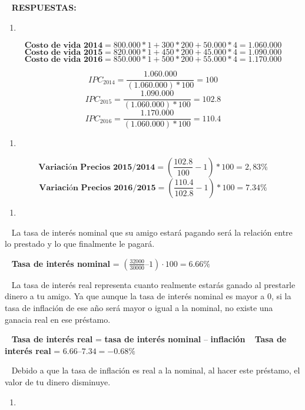 \documentclass[
  letterpaper,
  DIV=11,
  numbers=noendperiod]{scrreport}
\providecommand{\tightlist}{%
  \setlength{\itemsep}{0pt}\setlength{\parskip}{0pt}}\usepackage{longtable,booktabs,array}
\begin{document}
~ \textbf{RESPUESTAS:}

\begin{enumerate}
\def\labelenumi{\alph{enumi})}
\tightlist
\item
\end{enumerate}

\[\textbf{Costo de vida 2014} = 800.000*1+300*200+50.000*4 = 1.060.000\]
\[\textbf{Costo de vida 2015} = 820.000*1+450*200+45.000*4 = 1.090.000\]
\[\textbf{Costo de vida 2016} = 850.000*1+500*200+55.000*4 = 1.170.000\]

\[IPC_{2014} = \frac{1.060.000}{(1.060.000)*100} = 100\]
\[IPC_{2015} = \frac{1.090.000}{(1.060.000)*100} = 102.8\]
\[IPC_{2016} = \frac{1.170.000}{(1.060.000)*100} = 110.4\]

\begin{enumerate}
\def\labelenumi{\alph{enumi})}
\setcounter{enumi}{1}
\tightlist
\item
\end{enumerate}

\[\textbf{Variación Precios 2015/2014} = (\frac{ 102.8}{100}-1)*100 = 2,83 \%\]
\[\textbf{Variación Precios 2016/2015} = (\frac{110.4}{102.8}-1)*100 = 7.34 \%\]

\begin{enumerate}
\def\labelenumi{\alph{enumi})}
\setcounter{enumi}{2}
\tightlist
\item
\end{enumerate}

~ La tasa de interés nominal que su amigo estará pagando será la
relación entre lo prestado y lo que finalmente le pagará.

~ \textbf{Tasa de interés nominal} =
\((\frac{32000}{30000}– 1)\cdot 100 = 6.66\%\)

~ La tasa de interés real representa cuanto realmente estarás ganado al
prestarle dinero a tu amigo. Ya que aunque la tasa de interés nominal es
mayor a 0, si la tasa de inflación de ese año será mayor o igual a la
nominal, no existe una ganacia real en ese préstamo.

~ \textbf{Tasa de interés real} = \textbf{tasa de interés nominal} --
\textbf{inflación} ~ \textbf{Tasa de interés real} =
\(6.66 – 7.34 = -0.68\%\)

~ Debido a que la tasa de inflación es real a la nominal, al hacer este
préstamo, el valor de tu dinero disminuye.

\begin{enumerate}
\def\labelenumi{\alph{enumi})}
\setcounter{enumi}{3}
\tightlist
\item
\end{enumerate}
\end{document}
